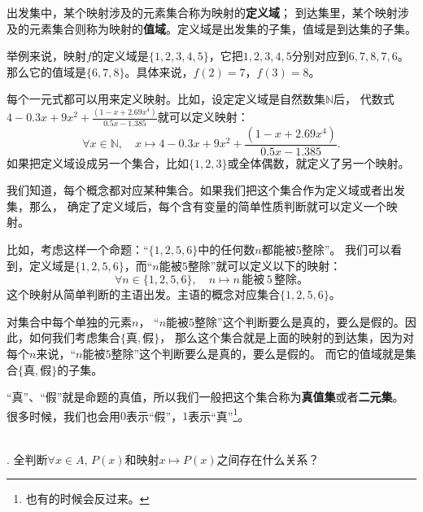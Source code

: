 出发集中，某个映射涉及的元素集合称为映射的\textbf{定义域}；
到达集里，某个映射涉及的元素集合则称为映射的\textbf{值域}。定义域是出发集的子集，值域是到达集的子集。

举例来说，映射$f$的定义域是$\{1,2,3,4,5\}$，它把$1,2,3,4,5$分别对应到$6,7,8,7,6$。
那么它的值域是$\{6,7,8\}$。具体来说，$f(2) = 7$，$f(3) = 8$。





每个一元式都可以用来定义映射。比如，设定定义域是自然数集$\mathbb{N}$后，
代数式$4-0.3x+9x^2+\frac{(1-x+2.69x^4)}{0.5x-1.385}$就可以定义映射：
$$ \forall x\in\mathbb{N}, \quad x \mapsto 4-0.3x+9x^2+\frac{(1-x+2.69x^4)}{0.5x-1.385}. $$
如果把定义域设成另一个集合，比如$\{1,2,3\}$或全体偶数，就定义了另一个映射。

我们知道，每个概念都对应某种集合。如果我们把这个集合作为定义域或者出发集，那么，
确定了定义域后，每个含有变量的简单性质判断就可以定义一个映射。

比如，考虑这样一个命题：“$\{1,2,5,6\}$中的任何数$n$都能被$5$整除”。
我们可以看到，定义域是$\{1,2,5,6\}$，而“$n$能被$5$整除”就可以定义以下的映射：
$$ \forall n\in \{1,2,5,6\} , \quad n \mapsto n\,\mbox{能被}\,5\,\mbox{整除。} $$
这个映射从简单判断的主语出发。主语的概念对应集合$\{1,2,5,6\}$。

对集合中每个单独的元素$n$，
“$n$能被$5$整除”这个判断要么是真的，要么是假的。因此，如何我们考虑集合$\{\mbox{真}, \mbox{假}\}$，
那么这个集合就是上面的映射的到达集，因为对每个$n$来说，“$n$能被$5$整除”这个判断要么是真的，要么是假的。
而它的值域就是集合$\{\mbox{真}, \mbox{假}\}$的子集。

“真”、“假”就是命题的真值，所以我们一般把这个集合称为\textbf{真值集}或者\textbf{二元集}。
很多时候，我们也会用$0$表示“假”，$1$表示“真”\footnote{也有的时候会反过来。}。

\begin{sk}\label{sk:2-2-0}
    \mbox{} \\
    . 全判断$\forall x \in A, \, P(x)$和映射$x \mapsto P(x)$之间存在什么关系？\\
\end{sk}


